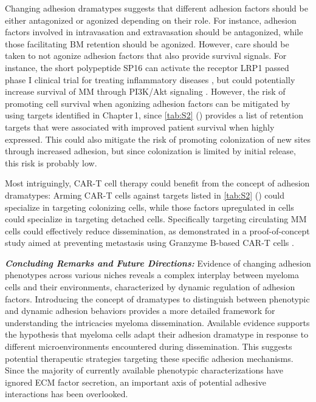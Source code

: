 Changing adhesion dramatypes suggests that different adhesion factors should be
either antagonized or agonized depending on their role. For instance, adhesion
factors involved in intravasation and extravasation should be antagonized, while
those facilitating BM retention%
\footterm{\footretentiveadhesionfactors}{\label{foot:retentiveadhesionfactors}}%
should be agonized. However, care should be taken to not agonize adhesion
factors that also provide survival signals. For instance, the short polypeptide
SP16 can activate the receptor LRP1  passed phase I clinical
trial for treating inflammatory diseases \cite{wohlfordPhaseClinicalTrial2021},
but could potentially increase survival of MM through PI3K/Akt signaling
\cite{potereDevelopingLRP1Agonists2019, heinemannInhibitingPI3KAKT2022}.
However, the risk of promoting cell survival when agonizing adhesion factors can
be mitigated by using targets identified in Chapter\,1, since \autoref{tab:S2}
() provides a list of retention
targets that were associated with
improved patient survival when highly expressed. This could also mitigate the
risk of promoting colonization of new sites through increased adhesion, but since
colonization is limited by initial release, this risk is probably low.

Most intriguingly, CAR-T cell therapy could benefit from the concept of adhesion
dramatypes: Arming CAR-T cells against targets listed in \autoref{tab:S2}
() could specialize in targeting colonizing cells, while those
factors upregulated in \nMAina cells could specialize in targeting detached
cells. Specifically targeting circulating MM cells could effectively reduce
dissemination, as demonstrated in a proof-of-concept study aimed at preventing
metastasis using Granzyme B-based CAR-T cells \cite{sunGranzymeBbasedCAR2024}.


\textbf{\textit{Concluding Remarks and Future Directions:}} Evidence of changing
adhesion phenotypes across various niches reveals a complex interplay between
myeloma cells and their environments, characterized by dynamic regulation of
adhesion factors. Introducing the concept of dramatypes to distinguish between
phenotypic and dynamic adhesion behaviors provides a more detailed framework for
understanding the intricacies myeloma dissemination. Available evidence supports
the hypothesis that myeloma cells adapt their adhesion dramatype in response to
different microenvironments encountered during dissemination. This suggests
potential therapeutic strategies targeting these specific adhesion mechanisms.
Since the majority of currently available phenotypic characterizations have
ignored \ac{ECM} factor secretion, an important axis of potential adhesive
interactions has been overlooked.

